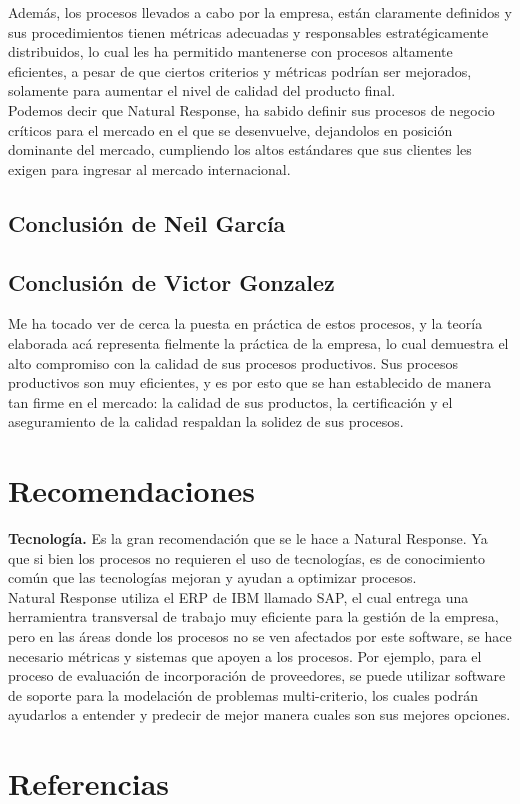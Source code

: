 \documentclass[12pt,letterpaper]{article}
\begin{document}
Además, los procesos llevados a cabo por la empresa, están claramente definidos y sus procedimientos tienen métricas adecuadas y responsables estratégicamente distribuidos, lo cual les ha permitido mantenerse con procesos altamente eficientes, a pesar de que ciertos criterios y métricas podrían ser mejorados, solamente para aumentar el nivel de calidad del producto final.\\

Podemos decir que Natural Response, ha sabido definir sus procesos de negocio críticos para el mercado en el que se desenvuelve, dejandolos en posición dominante del mercado, cumpliendo los altos estándares que sus clientes les exigen para ingresar al mercado internacional.

\subsection{Conclusión de Neil García}

\subsection{Conclusión de Victor Gonzalez}
Me ha tocado ver de cerca la puesta en práctica de estos procesos, y la teoría elaborada acá representa fielmente la práctica de la empresa, lo cual demuestra el alto compromiso con la calidad de sus procesos productivos. Sus procesos productivos son muy eficientes, y es por esto que se han establecido de manera tan firme en el mercado: la calidad de sus productos, la certificación y el aseguramiento de la calidad respaldan la solidez de sus procesos.\\

\section{Recomendaciones}
\textbf{Tecnología.} Es la gran recomendación que se le hace a Natural Response. Ya que si bien los procesos no requieren el uso de tecnologías, es de conocimiento común que las tecnologías mejoran y ayudan a optimizar procesos.\\
Natural Response utiliza el ERP de IBM llamado SAP, el cual entrega una herramientra transversal de trabajo muy eficiente para la gestión de la empresa, pero en las áreas donde los procesos no se ven afectados por este software, se hace necesario métricas y sistemas que apoyen a los procesos. Por ejemplo, para el proceso de evaluación de incorporación de proveedores, se puede utilizar software de soporte para la modelación de problemas multi-criterio, los cuales podrán ayudarlos a entender y predecir de mejor manera cuales son sus mejores opciones.

\section{Referencias}
\end{document}
